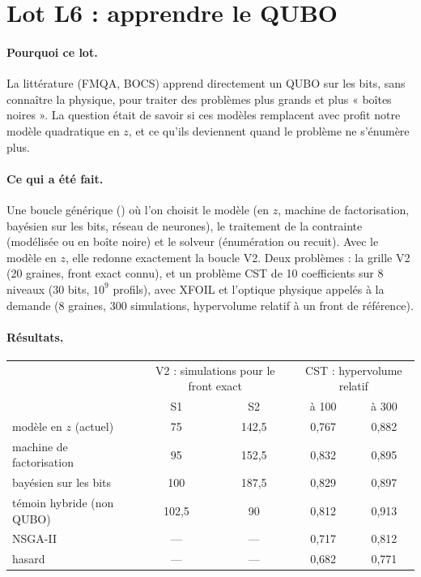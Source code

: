 \documentclass[11pt,a4paper]{report}
\begin{document}
\section{Lot L6 : apprendre le QUBO}\label{sec:v3-l6}
\paragraph{Pourquoi ce lot.} La littérature (FMQA, BOCS) apprend directement un QUBO sur les bits, sans connaître la physique, pour traiter des problèmes plus grands et plus « boîtes noires ». La question était de savoir si ces modèles remplacent avec profit notre modèle quadratique en $z$, et ce qu'ils deviennent quand le problème ne s'énumère plus.

\paragraph{Ce qui a été fait.} Une boucle générique () où l'on choisit le modèle (en $z$, machine de factorisation, bayésien sur les bits, réseau de neurones), le traitement de la contrainte (modélisée ou en boîte noire) et le solveur (énumération ou recuit). Avec le modèle en $z$, elle redonne exactement la boucle V2. Deux problèmes : la grille V2 (20 graines, front exact connu), et un problème CST de 10 coefficients sur 8 niveaux (30 bits, $10^9$ profils), avec XFOIL et l'optique physique appelés à la demande (8 graines, 300 simulations, hypervolume relatif à un front de référence).

\paragraph{Résultats.}
\begin{center}
\small
\begin{tabular}{lcccc}
\toprule
& \multicolumn{2}{c}{V2 : simulations pour le front exact} & \multicolumn{2}{c}{CST : hypervolume relatif} \\
& S1 & S2 & à 100 & à 300 \\
\midrule
modèle en $z$ (actuel) & 75 & 142,5 & 0,767 & 0,882 \\
machine de factorisation & 95 & 152,5 & 0,832 & 0,895 \\
bayésien sur les bits & 100 & 187,5 & 0,829 & 0,897 \\
témoin hybride (non QUBO) & 102,5 & 90 & 0,812 & 0,913 \\
NSGA-II & --- & --- & 0,717 & 0,812 \\
hasard & --- & --- & 0,682 & 0,771 \\
\bottomrule
\end{tabular}
\end{center}
\end{document}
